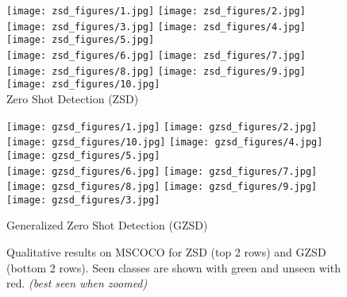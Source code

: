 \documentclass[runningheads]{llncs}
\begin{document}
\begin{figure}[tp]
    \centering
    \texttt{[image: zsd\_figures/1.jpg]}
    \texttt{[image: zsd\_figures/2.jpg]}
    \texttt{[image: zsd\_figures/3.jpg]}
    \texttt{[image: zsd\_figures/4.jpg]}
    \texttt{[image: zsd\_figures/5.jpg]} \\
    
    \texttt{[image: zsd\_figures/6.jpg]}
    \texttt{[image: zsd\_figures/7.jpg]}
    \texttt{[image: zsd\_figures/8.jpg]}
    \texttt{[image: zsd\_figures/9.jpg]}
    \texttt{[image: zsd\_figures/10.jpg]}   \\
    
    Zero Shot Detection (ZSD) \\  \vspace{.5em}
    
    \texttt{[image: gzsd\_figures/1.jpg]}
    \texttt{[image: gzsd\_figures/2.jpg]}
    \texttt{[image: gzsd\_figures/10.jpg]}
    \texttt{[image: gzsd\_figures/4.jpg]}
    \texttt{[image: gzsd\_figures/5.jpg]} \\
    
    \texttt{[image: gzsd\_figures/6.jpg]}
    \texttt{[image: gzsd\_figures/7.jpg]}
    \texttt{[image: gzsd\_figures/8.jpg]}
    \texttt{[image: gzsd\_figures/9.jpg]}
    \texttt{[image: gzsd\_figures/3.jpg]}   
    
    Generalized Zero Shot Detection (GZSD)\\  
    
    \caption{Qualitative results on MSCOCO for ZSD (top 2 rows) and GZSD (bottom 2 rows). Seen classes are shown with green and unseen with red. \emph{(best seen when zoomed)}}
    \label{fig: qual}
\end{figure}
\end{document}
